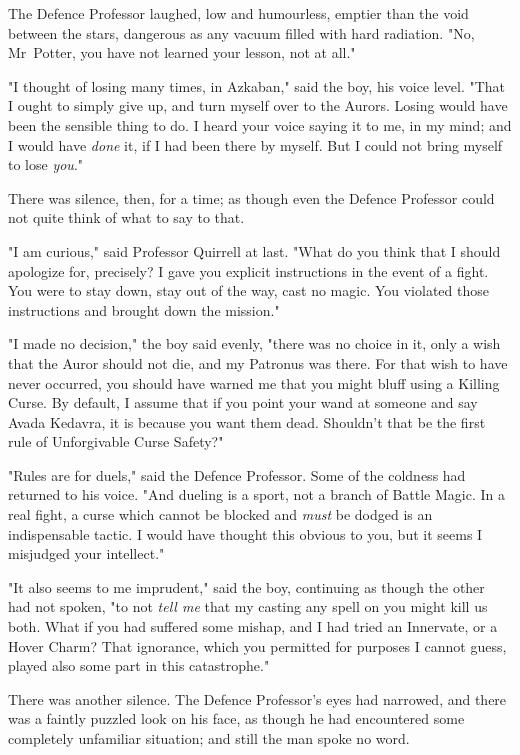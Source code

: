 The Defence Professor laughed, low and humourless, emptier than the void between
the stars, dangerous as any vacuum filled with hard radiation. "No, Mr~Potter,
you have not learned your lesson, not at all."

"I thought of losing many times, in Azkaban," said the boy, his voice level.
"That I ought to simply give up, and turn myself over to the Aurors. Losing
would have been the sensible thing to do. I heard your voice saying it to me,
in my mind; and I would have \emph{done} it, if I had been there by myself. But
I could not bring myself to lose \emph{you}."

There was silence, then, for a time; as though even the Defence Professor could
not quite think of what to say to that.

"I am curious," said Professor Quirrell at last. "What do you think that I
should apologize for, precisely? I gave you explicit instructions in the event
of a fight. You were to stay down, stay out of the way, cast no magic. You
violated those instructions and brought down the mission."

"I made no decision," the boy said evenly, "there was no choice in it, only a
wish that the Auror should not die, and my Patronus was there. For that wish to
have never occurred, you should have warned me that you might bluff using a
Killing Curse. By default, I assume that if you point your wand at someone and
say Avada Kedavra, it is because you want them dead. Shouldn't that be the
first rule of Unforgivable Curse Safety?"

"Rules are for duels," said the Defence Professor. Some of the coldness had
returned to his voice. "And dueling is a sport, not a branch of Battle Magic.
In a real fight, a curse which cannot be blocked and \emph{must} be dodged is
an indispensable tactic. I would have thought this obvious to you, but it seems
I misjudged your intellect."

"It also seems to me imprudent," said the boy, continuing as though the other
had not spoken, "to not \emph{tell me} that my casting any spell on you might
kill us both. What if you had suffered some mishap, and I had tried an
Innervate, or a Hover Charm? That ignorance, which you permitted for purposes I
cannot guess, played also some part in this catastrophe."

There was another silence. The Defence Professor's eyes had narrowed, and there
was a faintly puzzled look on his face, as though he had encountered some
completely unfamiliar situation; and still the man spoke no word.

